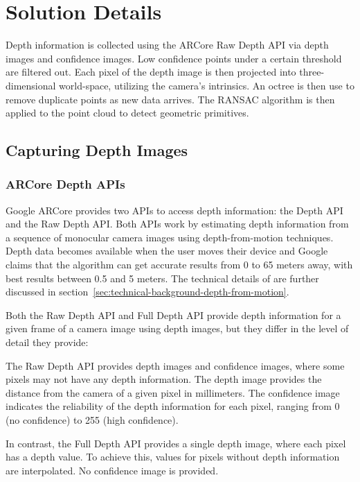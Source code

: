 \chapter{Solution Details}

Depth information is collected using the ARCore Raw Depth API via depth images and confidence images.
Low confidence points under a certain threshold are filtered out.
Each pixel of the depth image is then projected into three-dimensional world-space, utilizing the camera's intrinsics.
An octree is then use to remove duplicate points as new data arrives.
The RANSAC algorithm is then applied to the point cloud to detect geometric primitives.


\section{Capturing Depth Images}

\subsection{ARCore Depth APIs}


Google ARCore provides two APIs to access depth information: the Depth API and the Raw Depth API\@.
Both APIs work by estimating depth information from a sequence of monocular camera images using depth-from-motion techniques.
Depth data becomes available when the user moves their device and Google claims that the algorithm
can get accurate results from 0 to 65 meters away, with best results between 0.5 and 5 meters.
The technical details of are further discussed in section~\ref{sec:technical-background-depth-from-motion}.

Both the Raw Depth API and Full Depth API provide depth information for a given frame of a camera image using depth images, but they differ in the level of detail they provide:

The Raw Depth API provides depth images and confidence images, where some pixels may not have any depth information.
The depth image provides the distance from the camera of a given pixel in millimeters.
The confidence image indicates the reliability of the depth information for each pixel, ranging from 0 (no confidence) to 255 (high confidence).

In contrast, the Full Depth API provides a single depth image, where each pixel has a depth value.
To achieve this, values for pixels without depth information are interpolated.
No confidence image is provided.

